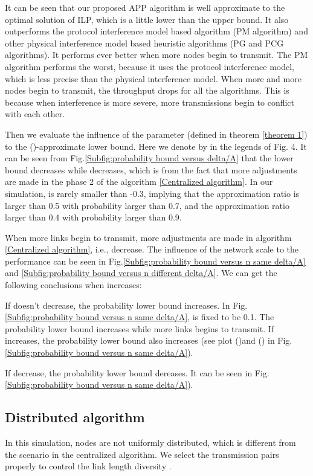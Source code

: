 \documentclass[conference]{IEEEtran}
\begin{document}
It can be seen that our proposed APP algorithm is well approximate
to the optimal solution of ILP, which is a little lower than the
upper bound. It also outperforms the protocol interference model
based algorithm (PM algorithm) and other physical interference model
based heuristic algorithms (PG and PCG algorithms). It performs ever
better when more nodes begin to transmit. The PM algorithm performs
the worst, because it uses the protocol interference model, which is
less precise than the physical interference model. When more and
more nodes begin to transmit, the throughput drops for all the
algorithms. This is because when interference is more severe, more
transmissions begin to conflict with each other.

Then we evaluate the influence of the parameter 
(defined in theorem \ref{theorem 1}) to the ()-approximate
lower bound. Here we denote  by  in
the legends of Fig. 4. It can be seen from
Fig.\ref{Subfig:probability bound versus delta/A} that the lower
bound decreases while  decreases, which is from
the fact that more adjustments are made in the phase 2 of the
algorithm \ref{Centralized algorithm}. In our simulation,  is rarely smaller than -0.3, implying that the
approximation ratio is larger than 0.5 with probability larger than
0.7, and the approximation ratio larger than 0.4 with probability
larger than 0.9.

When more links begin to transmit, more adjustments are made in
algorithm \ref{Centralized algorithm}, i.e.,  decrease.
The influence of the network scale  to the performance can be
seen in Fig.\ref{Subfig:probability bound versus n same delta/A} and
\ref{Subfig:probability bound versus n different delta/A}. We can
get the following conclusions when  increases:

 If  doesn't decrease, the probability lower
bound increases. In Fig.\ref{Subfig:probability bound versus n same
delta/A},  is fixed to be 0.1. The probability
lower bound increases while more links begins to transmit. If
 increases, the probability lower bound also
increases (see plot ()and () in Fig.\ref{Subfig:probability bound versus n same
delta/A}).

 If  decrease, the probability lower bound
dereases. It can be seen in Fig.\ref{Subfig:probability bound versus
n same delta/A}).










\subsection{Distributed algorithm}
In this simulation, nodes are not uniformly distributed, which is
different from the scenario in the centralized algorithm. We select
the transmission pairs properly to control the link length diversity
.
\end{document}
